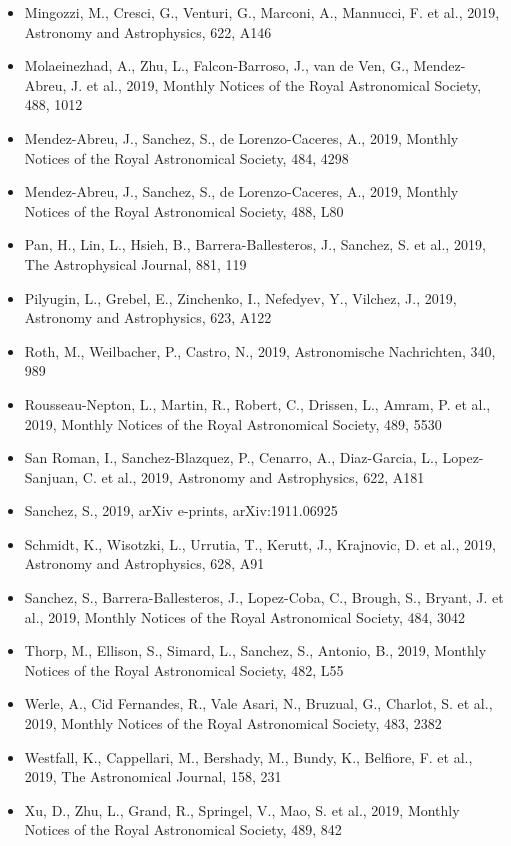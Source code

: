 \documentclass{letter}
\begin{document}
\begin{enumerate}
\begin{itemize}
\item Mingozzi, M., Cresci, G., Venturi, G., Marconi, A., Mannucci, F. et al., 2019, Astronomy and Astrophysics, 622, A146
\item Molaeinezhad, A., Zhu, L., Falcon-Barroso, J., van de Ven, G., Mendez-Abreu, J. et al., 2019, Monthly Notices of the Royal Astronomical Society, 488, 1012
\item Mendez-Abreu, J., Sanchez, S., de Lorenzo-Caceres, A., 2019, Monthly Notices of the Royal Astronomical Society, 484, 4298
\item Mendez-Abreu, J., Sanchez, S., de Lorenzo-Caceres, A., 2019, Monthly Notices of the Royal Astronomical Society, 488, L80
\item Pan, H., Lin, L., Hsieh, B., Barrera-Ballesteros, J., Sanchez, S. et al., 2019, The Astrophysical Journal, 881, 119
\item Pilyugin, L., Grebel, E., Zinchenko, I., Nefedyev, Y., Vilchez, J., 2019, Astronomy and Astrophysics, 623, A122
\item Roth, M., Weilbacher, P., Castro, N., 2019, Astronomische Nachrichten, 340, 989
\item Rousseau-Nepton, L., Martin, R., Robert, C., Drissen, L., Amram, P. et al., 2019, Monthly Notices of the Royal Astronomical Society, 489, 5530
\item San Roman, I., Sanchez-Blazquez, P., Cenarro, A., Diaz-Garcia, L., Lopez-Sanjuan, C. et al., 2019, Astronomy and Astrophysics, 622, A181
\item Sanchez, S., 2019, arXiv e-prints, arXiv:1911.06925
\item Schmidt, K., Wisotzki, L., Urrutia, T., Kerutt, J., Krajnovic, D. et al., 2019, Astronomy and Astrophysics, 628, A91
\item Sanchez, S., Barrera-Ballesteros, J., Lopez-Coba, C., Brough, S., Bryant, J. et al., 2019, Monthly Notices of the Royal Astronomical Society, 484, 3042
\item Thorp, M., Ellison, S., Simard, L., Sanchez, S., Antonio, B., 2019, Monthly Notices of the Royal Astronomical Society, 482, L55
\item Werle, A., Cid Fernandes, R., Vale Asari, N., Bruzual, G., Charlot, S. et al., 2019, Monthly Notices of the Royal Astronomical Society, 483, 2382
\item Westfall, K., Cappellari, M., Bershady, M., Bundy, K., Belfiore, F. et al., 2019, The Astronomical Journal, 158, 231
\item Xu, D., Zhu, L., Grand, R., Springel, V., Mao, S. et al., 2019, Monthly Notices of the Royal Astronomical Society, 489, 842

\end{itemize}
\end{enumerate}
\end{document}
